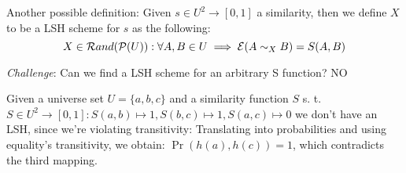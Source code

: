 	Another possible definition: Given $s \in U^2 \to [0,1]$ a similarity, then we define $X$ to be a LSH scheme for $s$ as the following:
	\begin{equation}
	X \in \mathcal{R}and(\mathcal{P}(U)) : \forall A, B \in U \implies \mathcal{E}(A\sim_X B) = S(A, B)
	\end{equation}
	
	\textit{Challenge}: Can we find a LSH scheme for an arbitrary S function? NO
	
	\ex \label{ex:transitivity} Given a universe set $U = \{a, b, c\}$ and a similarity function $S$ s. t.	$S \in U^2 \rightarrow [0, 1] : S(a, b) \mapsto 1, S(b, c) \mapsto 1, S(a, c) \mapsto 0$ we don't have an LSH, since we're violating transitivity:
	Translating into probabilities and using equality's transitivity, we obtain: $\Pr(h(a), h(c))=1$, which contradicts the third mapping.
	